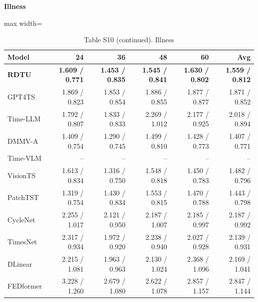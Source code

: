 \begin{table}[H]\centering\small
\caption*{Table S10 (continued). Illness}
\textbf{Illness}\par\smallskip
\begin{adjustbox}{max width=\linewidth}\begin{tabular}{lrrrrr}\toprule
\textbf{Model} & \textbf{24} & \textbf{36} & \textbf{48} & \textbf{60} & \textbf{Avg}\\\midrule
\rowcolor{blue!5}
\textbf{RDTU} & \textbf{1.609 / 0.771} & \textbf{1.453 / 0.835} & \textbf{1.545 / 0.841} & \textbf{1.630 / 0.802} & \textbf{1.559 / 0.812}\\
GPT4TS & 1.869 / 0.823 & 1.853 / 0.854 & 1.886 / 0.855 & 1.877 / 0.877 & 1.871 / 0.852\\
Time-LLM & 1.792 / 0.807 & 1.833 / 0.833 & 2.269 / 1.012 & 2.177 / 0.925 & 2.018 / 0.894\\
DMMV-A & 1.409 / 0.754 & 1.290 / 0.745 & 1.499 / 0.810 & 1.428 / 0.773 & 1.407 / 0.771\\
Time-VLM & -- & -- & -- & -- & --\\
VisionTS & 1.613 / 0.834 & 1.316 / 0.750 & 1.548 / 0.818 & 1.450 / 0.783 & 1.482 / 0.796\\
PatchTST & 1.319 / 0.754 & 1.430 / 0.834 & 1.553 / 0.815 & 1.470 / 0.788 & 1.443 / 0.798\\
CycleNet & 2.255 / 1.017 & 2.121 / 0.950 & 2.187 / 1.007 & 2.185 / 0.997 & 2.187 / 0.992\\
TimesNet & 2.317 / 0.934 & 1.972 / 0.920 & 2.238 / 0.940 & 2.027 / 0.928 & 2.139 / 0.931\\
DLinear & 2.215 / 1.081 & 1.963 / 0.963 & 2.130 / 1.024 & 2.368 / 1.096 & 2.169 / 1.041\\
FEDformer & 3.228 / 1.260 & 2.679 / 1.080 & 2.622 / 1.078 & 2.857 / 1.157 & 2.847 / 1.144\\
\bottomrule\end{tabular}\end{adjustbox}\end{table}
